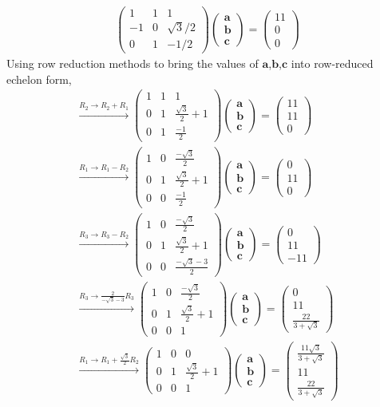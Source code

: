 \documentclass{article}
\newcommand{\myvec}[1]{\ensuremath{\begin{pmatrix}#1\end{pmatrix}}}
\let\vec\mathbf
\begin{document}
  \begin{align}
      \myvec{1 & 1 & 1\\-1 & 0 & \sqrt{3}/2\\0 &  1 & -1/2}\myvec{\vec{a}\\ \vec{b}\\ \vec{c}}= \myvec{11 \\ 0 \\ 0 }
  \end{align}
 Using row reduction methods to bring the values of $\vec{a}$,$\vec{b}$,$\vec{c}$ into row-reduced echelon form,
 \begin{align}
     \xrightarrow[]{R_2 \rightarrow R_2+R_1}\myvec{1 & 1 & 1\\ 0 & 1 & \frac{\sqrt{3}}{2}+1\\0 &  1 & \frac{-1}{2}}\myvec{\vec{a}\\ \vec{b}\\ \vec{c}}= \myvec{11 \\ 11 \\ 0 }\\
     \xrightarrow[]{R_1 \rightarrow R_1-R_2}\myvec{1 & 0 & \frac{-\sqrt{3}}{2}\\0 & 1 & \frac{\sqrt{3}}{2}+1\\0 &  0 & \frac{-1}{2}}\myvec{\vec{a}\\ \vec{b}\\ \vec{c}}= \myvec{0 \\ 11 \\ 0 }\\
     \xrightarrow[]{R_3 \rightarrow R_3-R_2}\myvec{1 & 0 & \frac{-\sqrt{3}}{2}\\0 & 1 & \frac{\sqrt{3}}{2}+1\\0 &  0 & \frac{-\sqrt{3}-3}{2}}\myvec{\vec{a}\\ \vec{b}\\ \vec{c}}= \myvec{0 \\ 11 \\ -11 }\\
     \xrightarrow[]{R_3 \rightarrow \frac{2}{-\sqrt{3}-3} R_3}\myvec{1 & 0 & \frac{-\sqrt{3}}{2}\\0 & 1 & \frac{\sqrt{3}}{2}+1\\0 &  0 & 1}\myvec{\vec{a}\\ \vec{b}\\ \vec{c}}= \myvec{0 \\ 11 \\ \frac{22}{3+\sqrt{3}} }\\
     \xrightarrow[]{R_1 \rightarrow R_1+\frac{\sqrt{3}}{2}R_2}\myvec{1 & 0 & 0 \\ 0 & 1 & \frac{\sqrt{3}}{2}+1\\0 &  0 & 1}\myvec{\vec{a}\\ \vec{b}\\ \vec{c}}= \myvec{\frac{11\sqrt{3}}{3+\sqrt{3}} \\ 11 \\\frac{22}{3+\sqrt{3}}  }\\

\end{align}
\end{document}
